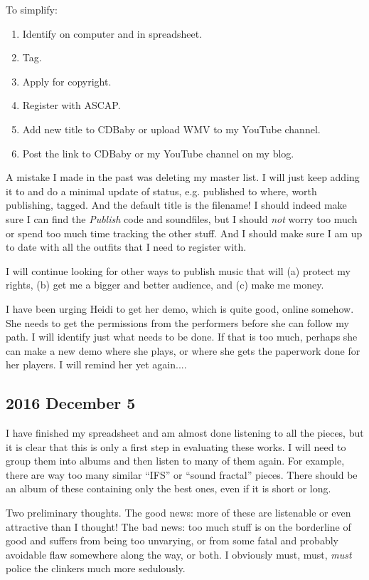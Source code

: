 \documentclass[english,11pt,letterpaper,onecolumn]{scrartcl}
\begin{document}
\noindent To simplify:

\begin{enumerate}
\item Identify on computer and in spreadsheet.
\item Tag. 
\item Apply for copyright. 
\item Register with ASCAP.
\item Add new title to CDBaby or upload WMV to my YouTube channel.
\item Post the link to CDBaby or my YouTube channel on my blog.
\end{enumerate}

A mistake I made in the past was deleting my master list. I will just keep adding it to and do a minimal update of status, e.g. published to where, worth publishing, tagged. And the default title is the filename! I should indeed make sure I can find the \emph{Publish} code and soundfiles, but I should \emph{not} worry too much or spend too much time tracking the other stuff. And I should make sure I am up to date with all the outfits that I need to register with.

I will continue looking for other ways to publish music that will (a) protect my rights, (b) get me a bigger and better audience, and (c) make me money.

I have been urging Heidi to get her demo, which is quite good, online somehow. She needs to get the permissions from the performers before she can follow my path. I will identify just what needs to be done. If that is too much, perhaps she can make a new demo where she plays, or where she gets the paperwork done for her players. I will remind her yet again....

\subsection*{2016 December 5}

I have finished my spreadsheet and am almost done listening to all the pieces, but it is clear that this is only a first step in evaluating these works. I will need to group them into albums and then listen to many of them again. For example, there are way too many similar ``IFS'' or ``sound fractal'' pieces. There should be an album of these containing only the best ones, even if it is short or long.

Two preliminary thoughts. The good news: more of these are listenable or even attractive than I thought! The bad news: too much stuff is on the borderline of good and suffers from being too unvarying, or from some fatal and probably avoidable flaw somewhere along the way, or both. I obviously must, must, \emph{must} police the clinkers much more sedulously.
\end{document}

